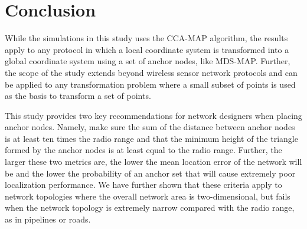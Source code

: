 \chapter{Conclusion}

While the simulations in this study uses the CCA-MAP algorithm, the results apply to any protocol in which a local coordinate system is transformed into a global coordinate system using a set of anchor nodes, like MDS-MAP.  Further, the scope of the study extends beyond wireless sensor network protocols and can be applied to any transformation problem where a small subset of points is used as the basis to transform a set of points.

This study provides two key recommendations for network designers when placing anchor nodes.  Namely, make sure the sum of the distance between anchor nodes is at least ten times the radio range and that the minimum height of the triangle formed by the anchor nodes is at least equal to the radio range.  Further, the larger these two metrics are, the lower the mean location error of the network will be and the lower the probability of an anchor set that will cause extremely poor localization performance.  We have further shown that these criteria apply to network topologies where the overall network area is two-dimensional, but fails when the network topology is extremely narrow compared with the radio range, as in pipelines or roads.


